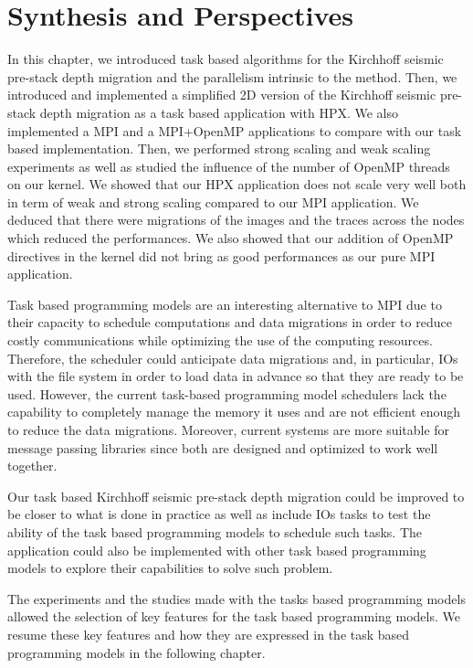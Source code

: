 \section{Synthesis and Perspectives}
In this chapter, we introduced task based algorithms for the Kirchhoff seismic pre-stack depth migration and the parallelism intrinsic to the method.
Then, we introduced and implemented a simplified 2D version of the Kirchhoff seismic pre-stack depth migration as a task based application with HPX.
We also implemented a MPI and a MPI+OpenMP applications to compare with our task based implementation.
Then, we performed strong scaling and weak scaling experiments as well as studied the influence of the number of OpenMP threads on our kernel.
We showed that our HPX application does not scale very well both in term of weak and strong scaling compared to our MPI application.
We deduced that there were migrations of the images and the traces across the nodes which reduced the performances.
We also showed that our addition of OpenMP directives in the kernel did not bring as good performances as our pure MPI application.

Task based programming models are an interesting alternative to MPI due to their capacity to schedule computations and data migrations in order to reduce costly communications while optimizing the use of the computing resources.
Therefore, the scheduler could anticipate data migrations and, in particular, IOs with the file system in order to load data in advance so that they are ready to be used.
However, the current task-based programming model schedulers lack the capability to completely manage the memory it uses and are not efficient enough to reduce the data migrations.
Moreover, current systems are more suitable for message passing libraries since both are designed and optimized to work well together.

Our task based Kirchhoff seismic pre-stack depth migration could be improved to be closer to what is done in practice as well as include IOs tasks to test the ability of the task based programming models to schedule such tasks.
The application could also be implemented with other task based programming models to explore their capabilities to solve such problem.

The experiments and the studies made with the tasks based programming models allowed the selection of key features for the task based programming models.
We resume these key features and how they are expressed in the task based programming models in the following chapter.